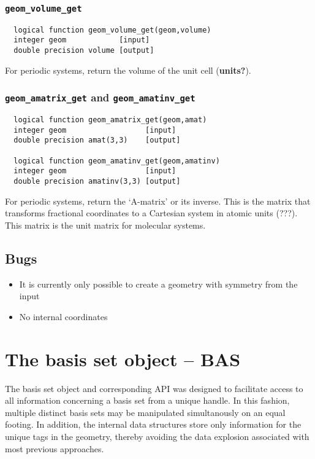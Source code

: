 \subsubsection{{\tt geom\_volume\_get}}
\begin{verbatim}
  logical function geom_volume_get(geom,volume)
  integer geom            [input]
  double precision volume [output]
\end{verbatim}
For periodic systems, return the volume of the unit cell ({\bf units?}).

\subsubsection{{\tt geom\_amatrix\_get} and {\tt geom\_amatinv\_get}}
\begin{verbatim}
  logical function geom_amatrix_get(geom,amat)
  integer geom                  [input]
  double precision amat(3,3)    [output]

  logical function geom_amatinv_get(geom,amatinv)
  integer geom                  [input]
  double precision amatinv(3,3) [output]
\end{verbatim}
For periodic systems, return the `A-matrix' or its inverse.  This is
the matrix that transforms fractional coordinates to a Cartesian
system in atomic units (???).  This matrix is the unit matrix for
molecular systems.

\subsection{Bugs}

\begin{itemize}
\item It is currently only possible to create a geometry with symmetry
  from the input
\item No internal coordinates
\end{itemize}


\section{The basis set object -- BAS}


The basis set object and corresponding API was designed to facilitate
access to all information concerning a basis set from a unique handle.
In this fashion, multiple distinct basis sets may be manipulated
simultanously on an equal footing.  In addition, the internal data
structures store only information for the unique tags in the geometry,
thereby avoiding the data explosion associated with most previous
approaches.


